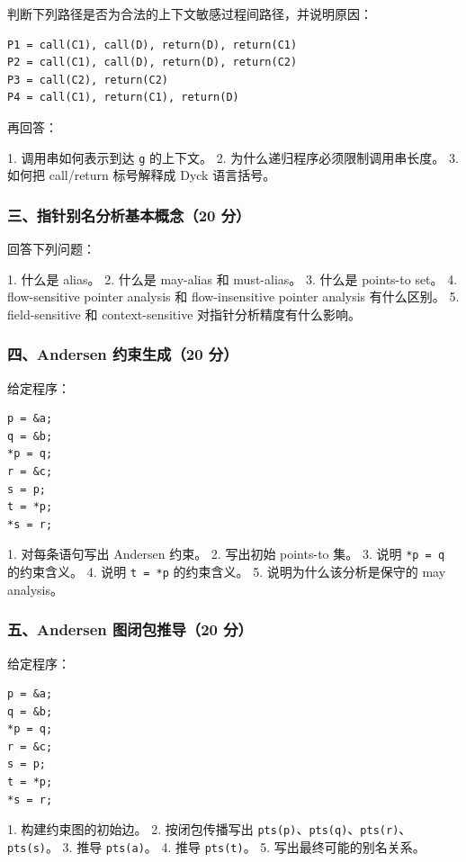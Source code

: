 \documentclass[UTF8]{ctexart}
\begin{document}
判断下列路径是否为合法的上下文敏感过程间路径，并说明原因：

\begin{Verbatim}[fontsize=\small,breaklines=true]
P1 = call(C1), call(D), return(D), return(C1)
P2 = call(C1), call(D), return(D), return(C2)
P3 = call(C2), return(C2)
P4 = call(C1), return(C1), return(D)
\end{Verbatim}

再回答：

1. 调用串如何表示到达 \texttt{g} 的上下文。 2. 为什么递归程序必须限制调用串长度。 3. 如何把 call/return 标号解释成 Dyck 语言括号。

\subsubsection*{三、指针别名分析基本概念（20 分）}

回答下列问题：

1. 什么是 alias。 2. 什么是 may-alias 和 must-alias。 3. 什么是 points-to set。 4. flow-sensitive pointer analysis 和 flow-insensitive pointer analysis 有什么区别。 5. field-sensitive 和 context-sensitive 对指针分析精度有什么影响。

\subsubsection*{四、Andersen 约束生成（20 分）}

给定程序：

\begin{Verbatim}[fontsize=\small,breaklines=true]
p = &a;
q = &b;
*p = q;
r = &c;
s = p;
t = *p;
*s = r;
\end{Verbatim}

1. 对每条语句写出 Andersen 约束。 2. 写出初始 points-to 集。 3. 说明 \texttt{*p = q} 的约束含义。 4. 说明 \texttt{t = *p} 的约束含义。 5. 说明为什么该分析是保守的 may analysis。

\subsubsection*{五、Andersen 图闭包推导（20 分）}

给定程序：

\begin{Verbatim}[fontsize=\small,breaklines=true]
p = &a;
q = &b;
*p = q;
r = &c;
s = p;
t = *p;
*s = r;
\end{Verbatim}

1. 构建约束图的初始边。 2. 按闭包传播写出 \texttt{pts(p)}、\texttt{pts(q)}、\texttt{pts(r)}、\texttt{pts(s)}。 3. 推导 \texttt{pts(a)}。 4. 推导 \texttt{pts(t)}。 5. 写出最终可能的别名关系。
\end{document}
